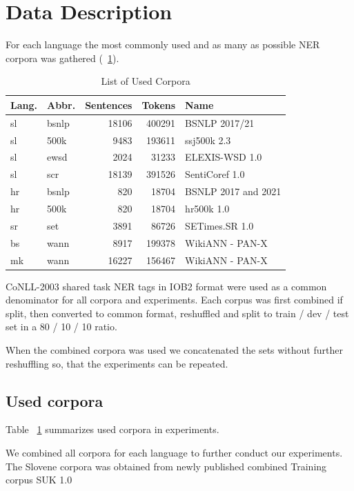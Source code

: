 \documentclass[sigconf]{acmart}
\begin{document}
\section{Data Description}
For each language the most commonly used and as many as possible NER corpora was gathered (~\ref{tab:corpora}).
\begin{table}[H]
  \caption{List of Used Corpora}
  \label{tab:corpora}
  \begin{tabular}{llrrl}
    \toprule
    Lang.&Abbr.&Sentences&Tokens&Name\\
    \midrule
    sl&bsnlp&18106&400291&BSNLP 2017/21\cite{piskorski-etal-2021-slav}\\
    sl&500k&9483&193611&ssj500k 2.3\cite{ssj500k-23}\\
    sl&ewsd&2024&31233&{ELEXIS}-{WSD} 1.0\cite{ELEXIS-WSD-10}\\
    sl&scr&18139&391526&{SentiCoref} 1.0\cite{SentiCoref-10}\\
    \midrule
    hr&bsnlp&820&18704&BSNLP 2017 and 2021\cite{piskorski-etal-2021-slav}\\
    hr&500k&820&18704&hr500k 1.0\cite{hr500k-10}\\
    \midrule
    sr&set&3891&86726&{SETimes}.{SR} 1.0\cite{SETimes-SR-1.0}\\
    \midrule
    bs&wann&8917&199378&WikiANN - PAN-X\cite{rahimi-etal-2019-massively}\\
    \midrule
    mk&wann&16227&156467&WikiANN - PAN-X\cite{rahimi-etal-2019-massively}\\
  \bottomrule
  \end{tabular}
\end{table}
CoNLL-2003 shared task\cite{CoNLL2003} NER tags in IOB2\cite{IOB2} format were used as a common denominator for all corpora and experiments.
Each corpus was first combined if split, then converted to common format, reshuffled and split to train / dev / test set in a 80 / 10 / 10 ratio.

When the combined corpora was used we concatenated the sets without further reshuffling so, that the experiments can be repeated.
\subsection{Used corpora}
Table ~\ref{tab:corpora} summarizes used corpora in experiments.

We combined all corpora for each language to further conduct our experiments.
The Slovene corpora was obtained from newly published combined Training corpus {SUK} 1.0\cite{SUK-1.0}
\end{document}
